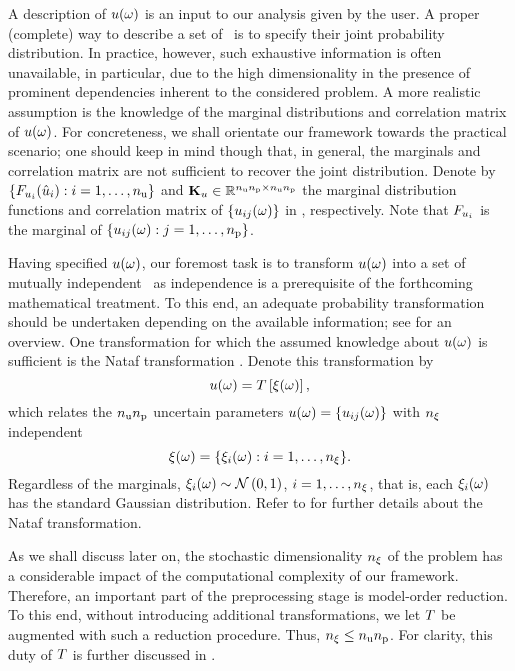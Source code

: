 A description of $u(\omega)$ is an input to our analysis given by the user.
A proper (complete) way to describe a set of \rvs\ is to specify their joint probability distribution.
In practice, however, such exhaustive information is often unavailable, in particular, due to the high dimensionality in the presence of prominent dependencies inherent to the considered problem.
A more realistic assumption is the knowledge of the marginal distributions and correlation matrix of $u(\omega)$.
For concreteness, we shall orientate our framework towards the practical scenario; one should keep in mind though that, in general, the marginals and correlation matrix are not sufficient to recover the joint distribution.
Denote by $\{ F_{u_i}(\hat{u}_i): i = 1, \dots, {n_\text{u}} \}$ and $\mathbf{K}_u \in \mathbb{R}^{{n_\text{u}} {n_\text{p}} \times {n_\text{u}} {n_\text{p}}}$ the marginal distribution functions and correlation matrix of $\{ u_{ij}(\omega) \}$ in , respectively.
Note that $F_{u_i}$ is the marginal of $\{ u_{ij}(\omega): j = 1, \dots, {n_\text{p}} \}$.

Having specified $u(\omega)$, our foremost task is to transform $u(\omega)$ into a set of mutually independent \rvs\ as independence is a prerequisite of the forthcoming mathematical treatment.
To this end, an adequate probability transformation should be undertaken depending on the available information; see \cite{eldred2008} for an overview.
One transformation for which the assumed knowledge about $u(\omega)$ is sufficient is the Nataf transformation \cite{li2008}.
Denote this transformation by
\begin{equation} \elab{probability-transformation}
  \u(\o) = \oTransform{\z(\o)},
\end{equation}
which relates the ${n_\text{u}} {n_\text{p}}$ uncertain parameters $u(\omega) = \{ u_{ij}(\omega) \}$ with ${n_\xi}$ independent \rvs
\begin{equation} \elab{independent-random-variables}
  \z(\o) = \{ \z_i(\o): i = 1, \dots, \nvars \}.
\end{equation}
Regardless of the marginals, $\xi_i(\omega) \sim \mathcal{N}\left( 0, 1 \right)$, $i = 1, \dots, {n_\xi}$, that is, each $\xi_i(\omega)$ has the standard Gaussian distribution.
Refer to  for further details about the Nataf transformation.

As we shall discuss later on, the stochastic dimensionality ${n_\xi}$ of the problem has a considerable impact of the computational complexity of our framework.
Therefore, an important part of the preprocessing stage is model-order reduction.
To this end, without introducing additional transformations, we let $\oTransform$ be augmented with such a reduction procedure.
Thus, ${n_\xi} \leq {n_\text{u}} {n_\text{p}}$.
For clarity, this duty of $\oTransform$ is further discussed in .

